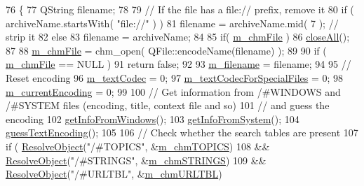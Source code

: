 \begin{DoxyCode}
76 \{
77     QString filename;
78             
79     \textcolor{comment}{// If the file has a file:// prefix, remove it}
80     \textcolor{keywordflow}{if} ( archiveName.startsWith( \textcolor{stringliteral}{"file://"} ) )
81         filename = archiveName.mid( 7 ); \textcolor{comment}{// strip it}
82     \textcolor{keywordflow}{else}
83         filename = archiveName;
84     
85     \textcolor{keywordflow}{if}( \hyperlink{classLCHMFileImpl_a82d1d6a252134efcf90a82bf8ffd8493}{m\_chmFile} )
86         \hyperlink{classLCHMFileImpl_a483f7cc028d300635b87e6975c6a1757}{closeAll}();
87 
88     \hyperlink{classLCHMFileImpl_a82d1d6a252134efcf90a82bf8ffd8493}{m\_chmFile} = chm\_open( QFile::encodeName(filename) );
89     
90     \textcolor{keywordflow}{if} ( \hyperlink{classLCHMFileImpl_a82d1d6a252134efcf90a82bf8ffd8493}{m\_chmFile} == NULL )
91         \textcolor{keywordflow}{return} \textcolor{keyword}{false};
92 
93     \hyperlink{classLCHMFileImpl_a7e8bf327eeb1f4a3ccebb46ae6bd1bfa}{m\_filename} = filename;
94     
95     \textcolor{comment}{// Reset encoding}
96     \hyperlink{classLCHMFileImpl_a2f941b3f26a4f845d3e785cfad0eeb58}{m\_textCodec} = 0;
97     \hyperlink{classLCHMFileImpl_ad50032706377cebb647d43f348904942}{m\_textCodecForSpecialFiles} = 0;
98     \hyperlink{classLCHMFileImpl_a365b502e727dd2202dec204815d23c50}{m\_currentEncoding} = 0;
99     
100     \textcolor{comment}{// Get information from /#WINDOWS and /#SYSTEM files (encoding, title, context file and so)}
101     \textcolor{comment}{// and guess the encoding}
102     \hyperlink{classLCHMFileImpl_a27eafb562224f7159476f816492fa32d}{getInfoFromWindows}();
103     \hyperlink{classLCHMFileImpl_acb5511d96588dbcaa557d3e5dae04b75}{getInfoFromSystem}();
104     \hyperlink{classLCHMFileImpl_aaa1a1c472fc85e30e6d970b9056c7cba}{guessTextEncoding}();
105 
106     \textcolor{comment}{// Check whether the search tables are present}
107     \textcolor{keywordflow}{if} ( \hyperlink{classLCHMFileImpl_a78d3e549251cd4c842aecca5aa1ede36}{ResolveObject}(\textcolor{stringliteral}{"/#TOPICS"}, &\hyperlink{classLCHMFileImpl_ae4a2d92d948b4482781b6b539ff1dd75}{m\_chmTOPICS})
108             && \hyperlink{classLCHMFileImpl_a78d3e549251cd4c842aecca5aa1ede36}{ResolveObject}(\textcolor{stringliteral}{"/#STRINGS"}, &\hyperlink{classLCHMFileImpl_a73ed5eac37c22b2cd6d7fbc2a78b60db}{m\_chmSTRINGS})
109             && \hyperlink{classLCHMFileImpl_a78d3e549251cd4c842aecca5aa1ede36}{ResolveObject}(\textcolor{stringliteral}{"/#URLTBL"}, &\hyperlink{classLCHMFileImpl_a6570c3bf72f4ed7ee5992005a88320c9}{m\_chmURLTBL})

\end{DoxyCode}
